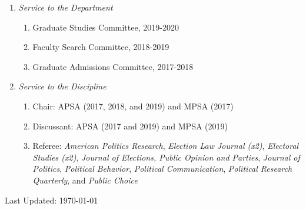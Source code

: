 \documentclass[11pt]{article}
\def\footerlink{}
\begin{document}
\begin{enumerate}[topsep = 0pt, itemsep = -1ex, partopsep  = 1ex, parsep = 1ex]
	
	\item[] \textit{Service to the Department}
	
	\begin{enumerate}[topsep = 0pt, itemsep = -1ex, partopsep = -1ex, parsep = 1ex]
		
		\item[] Graduate Studies Committee, 2019-2020
		\item[] Faculty Search Committee, 2018-2019 
		\item[] Graduate Admissions Committee, 2017-2018 \\
		
	\end{enumerate}

	\item[] \textit{Service to the Discipline}

	\begin{enumerate}[topsep = 0pt, itemsep = -1ex, partopsep  = -1ex, parsep = 1ex]
	
	\item[] Chair: APSA (2017, 2018, and 2019) and MPSA (2017)
	
	\item[] Discussant: APSA (2017 and 2019) and MPSA (2019)
	
	\item[] Referee: \textit{American Politics Research}, \textit{Election Law Journal (x2)}, \textit{Electoral Studies (x2)}, \textit{Journal of Elections, Public Opinion and Parties}, \textit{Journal of Politics}, \textit{Political Behavior}, \textit{Political Communication}, \textit{Political Research Quarterly}, and \textit{Public Choice} \\
	
	\end{enumerate}

\end{enumerate}

\bigskip

\begin{center}
  \begin{footnotesize}
    Last Updated: \today \\
    \href{\footerlink}{\texttt{\footerlink}}
  \end{footnotesize}
\end{center}
\end{document}

